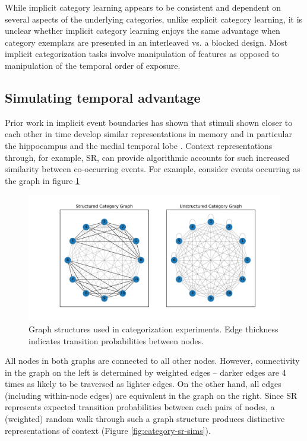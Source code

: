 While implicit category learning appears to be consistent and dependent on several aspects of the underlying categories, unlike explicit category learning, it is unclear whether implicit category learning enjoys the same advantage when category exemplars are presented in an interleaved vs. a blocked design. Most implicit categorization tasks involve manipulation of features as opposed to manipulation of the temporal order of exposure. 

\subsection{Simulating temporal advantage}

Prior work in implicit event boundaries has shown that stimuli shown closer to each other in time develop similar representations in memory and in particular the hippocampus and the medial temporal lobe \cite{schapiro2013neural, turk2019hippocampus, bonner2021object}. Context representations through, for example, SR, can provide algorithmic accounts for such increased similarity between co-occurring events. For example, consider events occurring as the graph in figure \ref{fig:category-graph-structures}

\begin{figure}[ht]
    \centering
    \includegraphics[width = \textwidth]{chapter_notebooks/chapter_4/figures/cat_graphs.png}
    \caption{Graph structures used in categorization experiments. Edge thickness indicates transition probabilities between nodes.}
    \label{fig:category-graph-structures}
\end{figure}

All nodes in both graphs are connected to all other nodes. However, connectivity in the graph on the left is determined by weighted edges -- darker edges are 4 times as likely to be traversed as lighter edges. On the other hand, all edges (including within-node edges) are equivalent in the graph on the right. Since SR represents expected transition probabilities between each pairs of nodes, a (weighted) random walk through such a graph structure produces distinctive representations of context (Figure \ref{fig:category-sr-sims}).


